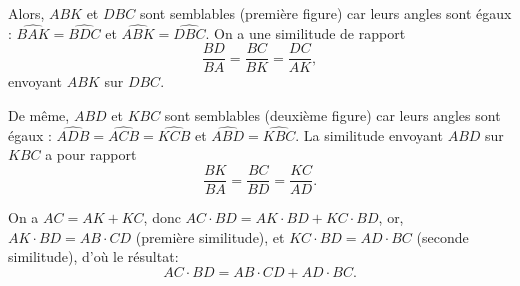 {\begin{enumerate}
{Alors,  $ABK$ et $DBC$ sont semblables (première figure) car leurs angles sont égaux :  $\widehat{BAK} = \widehat{BDC}$ et $\widehat{ABK} = \widehat{DBC}$. On a une similitude de rapport 
\[\frac{BD}{BA} = \frac{BC}{BK} = \frac{DC}{AK},\]
envoyant $ABK$ sur $DBC$.

De même, $ABD$ et $KBC$ sont semblables (deuxième figure) car leurs angles sont égaux : $\widehat{ADB} = \widehat{ACB} = \widehat{KCB}$ et $\widehat{ABD} = \widehat{KBC}$. La similitude envoyant $ABD$ sur $KBC$  a pour rapport \[\frac{BK}{BA}=\frac{BC}{BD} = \frac{KC}{AD}.\]

 


On a $AC = AK + KC$, donc $AC\cdot BD  = AK \cdot BD + KC\cdot BD$, 
or, $AK\cdot BD = AB\cdot CD$ (première similitude), et $KC \cdot BD = AD\cdot BC$ (seconde similitude), d'où le résultat:
\[ AC\cdot BD = AB\cdot CD + AD\cdot BC.\]
}
\end{enumerate}
}
